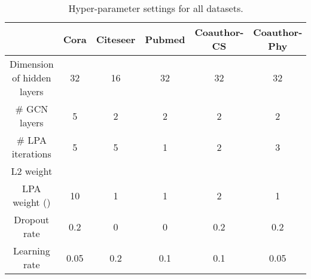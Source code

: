 \documentclass{article}
\begin{document}
		\begin{table}[h]
			\centering
			\setlength{\tabcolsep}{10pt}
			\begin{tabular}{c|ccccc}
				\hline
				& \textbf{Cora} & \textbf{Citeseer} & \textbf{Pubmed} & \textbf{Coauthor-CS} & \textbf{Coauthor-Phy} \\
				\hline
				Dimension of hidden layers & 32 & 16 & 32 & 32 & 32 \\
				\# GCN layers & 5 & 2 & 2 & 2 & 2 \\
				\# LPA iterations & 5 & 5 & 1 & 2 & 3 \\
				L2 weight &  &  &  &  &  \\
				LPA weight () & 10 & 1 & 1 & 2 & 1 \\
				Dropout rate & 0.2 & 0 & 0 & 0.2 & 0.2 \\
				Learning rate & 0.05 & 0.2 & 0.1 & 0.1 & 0.05 \\
				\hline
			\end{tabular}
			\caption{Hyper-parameter settings for all datasets.}
			\label{table:ps}
		\end{table}
\end{document}
